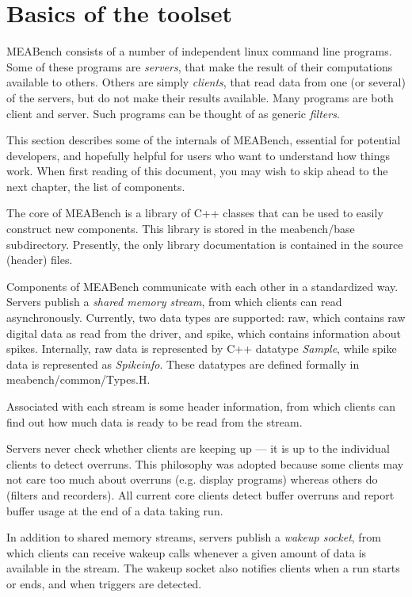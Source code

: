 \documentclass[12pt,oneside]{book}
\def\Meabench{{MEABench}\xspace}
\def\meabench{{MEABench}\xspace}
\def\streamtype#1{{\sc #1}\xspace}
\def\raw{\streamtype{raw}}
\def\spike{\streamtype{spike}}
\def\filename#1{{\sf #1}\xspace}
\begin{document}
\chapter{Basics of the toolset}
 
\Meabench consists of a number of independent linux command line
programs. Some of these programs are \emph{servers}, that make the
result of their computations available to others. Others are simply
\emph{clients}, that read data from one (or several) of the servers,
but do not make their results available. Many programs are both client
and server. Such programs can be thought of as generic \emph{filters}.

This section describes some of the internals of \meabench,  essential
for potential developers, and hopefully helpful for users who want to
understand how things work. When first reading of this document, you
may wish to skip ahead to the next chapter, the list of components.

The core of \meabench is a library of C++ classes that can be used to
easily construct new components. This library is stored in the
\filename{meabench/base} subdirectory. Presently, the only library
documentation is contained in the source (header) files.

Components of \meabench communicate with each other in a standardized
way. Servers publish a \emph{shared memory stream}, from which clients
can read asynchronously. Currently, two data types are supported:
\raw, which contains raw digital data as read from the driver,
and \spike, which contains information about spikes.
Internally, \raw data is represented by C++ datatype
\emph{Sample}, while \spike data is represented as \emph{Spikeinfo}.
These datatypes are defined formally in \filename{meabench/common/Types.H}.

Associated with each stream is some header information, from which
clients can find out how much data is ready to be read from the stream.

Servers never check whether clients are keeping up --- it is up to the
individual clients to detect overruns. This philosophy was adopted
because some clients may not care too much about overruns (e.g.
display programs) whereas others do (filters and recorders). All
current core clients detect buffer overruns and report buffer usage at
the end of a data taking run.

In addition to shared memory streams, servers publish a \emph{wakeup
socket}, from which clients can receive wakeup calls whenever a given
amount of data is available in the stream. The wakeup socket also
notifies clients when a run starts or ends, and when triggers are
detected.
\end{document}
